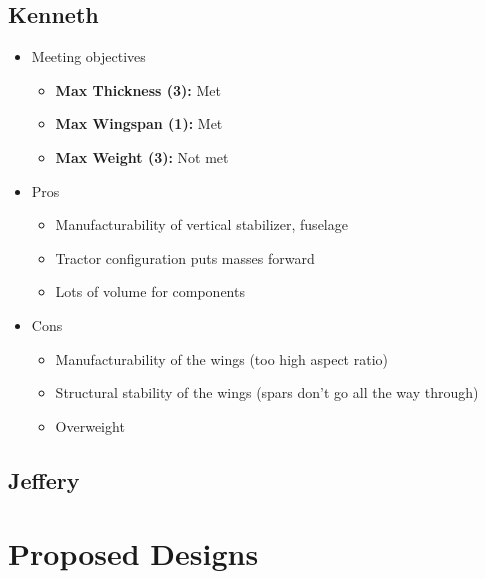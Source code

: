     \subsection{Kenneth}
        
        \begin{itemize}
            \item Meeting objectives
            \begin{itemize}
                \item \textbf{Max Thickness (3):} Met
                \item \textbf{Max Wingspan (1):} Met
                \item \textbf{Max Weight (3):} Not met
            \end{itemize}
            \item Pros
            \begin{itemize}
                \item Manufacturability of vertical stabilizer, fuselage
                \item Tractor configuration puts masses forward
                \item Lots of volume for components
            \end{itemize}
            \item Cons
            \begin{itemize}
                \item Manufacturability of the wings (too high aspect ratio)
                \item Structural stability of the wings (spars don't go all the way through)
                \item Overweight
            \end{itemize}
        \end{itemize}
        
    \subsection{Jeffery}

\section{Proposed Designs}

